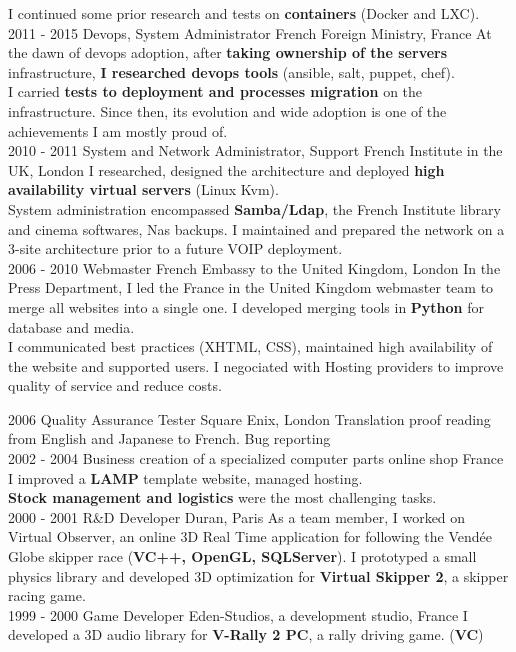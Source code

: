 \documentclass[]{cv-class}
\begin{document}
\begin{entrylist}
{    I continued some prior research and tests on \textbf{containers} (Docker and LXC). \\}
  \entry
    {2011 - 2015}
    {Devops, System Administrator}
    {French Foreign Ministry, France}
    {At the dawn of devops adoption, after \textbf{taking ownership of the servers} infrastructure, \textbf{I researched devops tools} (ansible, salt, puppet, chef).\\ I carried \textbf{tests to deployment and processes migration} on the infrastructure. Since then, its evolution and wide adoption is one of the achievements I am mostly proud of. \\}
  \entry
    {2010 - 2011}
    {System and Network Administrator, Support}
    {French Institute in the UK, London}
    {I researched, designed the architecture and deployed \textbf{high availability virtual servers} (Linux Kvm).\\
    System administration encompassed \textbf{Samba/Ldap}, the French Institute library and cinema softwares, Nas backups. I maintained and prepared the network on a 3-site architecture prior to a future VOIP deployment. \\}
  \entry
    {2006 - 2010}
    {Webmaster}
    {French Embassy to the United Kingdom, London}
    {In the Press Department, I led the France in the United Kingdom webmaster team to merge all websites into a single one. I developed merging tools in \textbf{Python} for database and media.\\
I communicated best practices (XHTML, CSS), maintained high availability of the website and supported users.
I negociated with Hosting providers to improve quality of service and reduce costs. \\}\end{entrylist}
\begin{entrylist}
  \entry
    {2006}
    {Quality Assurance Tester}
    {Square Enix, London}
    {Translation proof reading from English and Japanese to French. Bug reporting \\}  \entry
    {2002 - 2004}
    {Business creation of a specialized computer parts online shop}
    {France}
    {I improved a \textbf{LAMP} template website,  managed hosting.\\
    \textbf{Stock management and logistics} were the most challenging tasks. \\}
\entry
    {2000 - 2001}
    {R\&D Developer}
    {Duran, Paris}
    {As a team member, I worked on Virtual Observer, an online 3D Real Time application for following the Vendée Globe skipper race (\textbf{VC++, OpenGL, SQLServer}). I prototyped a small physics library and developed 3D optimization for \textbf{Virtual Skipper 2}, a skipper racing game. \\}
  \entry
    {1999 - 2000}
    {Game Developer}
    {Eden-Studios, a development studio, France}
    {I developed a 3D audio library for \textbf{V-Rally 2 PC}, a rally driving game. (\textbf{VC}) \\}
\end{entrylist}
    
\end{document}
